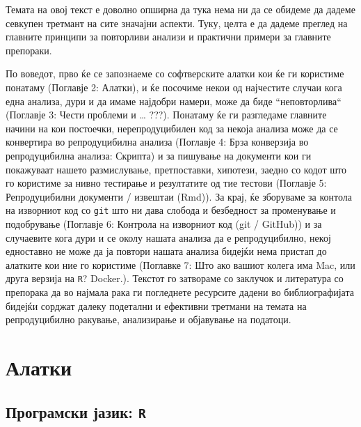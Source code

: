 \documentclass[
]{book}
\begin{document}
Темата на овој текст е доволно опширна да тука нема ни да се обидеме да дадеме севкупен третмант на сите значајни аспекти. Туку, целта е да дадеме преглед на главните принципи за повторливи анализи и практични примери за главните препораки.

По воведот, прво ќе се запознаеме со софтверските алатки кои ќе ги користиме понатаму (Поглавје 2: Алатки), и ќе посочиме некои од најчестите случаи кога една анализа, дури и да имаме најдобри намери, може да биде ``неповторлива`` (Поглавје 3: Чести проблеми и \ldots{} ???). Понатаму ќе ги разгледаме главните начини на кои постоечки, нерепродуцибилен код за некоја анализа може да се конвертира во репродуцибилна анализа (Поглавје 4: Брза конверзија во репродуцибилна анализа: Скрипта) и за пишување на документи кои ги покажуваат нашето размислување, претпоставки, хипотези, заедно со кодот што го користиме за нивно тестирање и резултатите од тие тестови (Поглавје 5: Репродуцибилни документи / извештаи (Rmd)). За крај, ќе зборуваме за контола на изворниот код со \texttt{git} што ни дава слобода и безбедност за променување и подобрување (Поглавје 6: Контрола на изворниот код (git / GitHub)) и за случаевите кога дури и се околу нашата анализа да е репродуцибилно, некој едноставно не може да ја повтори нашата анализа бидејќи нема пристап до алатките кои ние го користиме (Поглавке 7: Што ако вашиот колега има Mac, или друга верзија на \texttt{R}? Docker.). Текстот го затвораме со заклучок и литература со препорака да во најмала рака ги погледнете ресурсите дадени во библиографијата бидејќи сорджат далеку подетални и ефективни третмани на темата на репродуцибилно ракување, анализирање и објавување на податоци.

\hypertarget{tools}{%
\chapter{Алатки}\label{tools}}

\hypertarget{ux43fux440ux43eux433ux440ux430ux43cux441ux43aux438-ux458ux430ux437ux438ux43a-r}{%
\section{\texorpdfstring{Програмски јазик: \texttt{R}}{Програмски јазик: R}}\label{ux43fux440ux43eux433ux440ux430ux43cux441ux43aux438-ux458ux430ux437ux438ux43a-r}}
\end{document}
